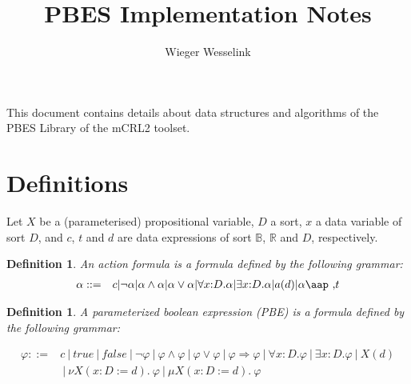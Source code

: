 \documentclass{article}
\title{PBES Implementation Notes}
\author{Wieger Wesselink}
\newtheorem{definition}[theorem]{Definition}
\begin{document}
\maketitle

This document contains details about data structures and algorithms of the
PBES Library of the mCRL2 toolset.

\section{Definitions}

Let $X$ be a (parameterised) propositional variable, $D$ a sort, $x$ a data
variable of sort $D$, and $c$, $t$ and $d$ are data expressions of sort $%
\mathbb{B}$, $\mathbb{R}$ and $D$, respectively.


\begin{definition}
An action formula is a formula defined by the following grammar:
\begin{equation*}
\begin{array}{lc}
\alpha ::= & c|\lnot \alpha |\alpha \wedge \alpha |\alpha \vee \alpha
|\forall x{:}D.\alpha |\exists x{:}D.\alpha |a(d)|\alpha \mbox{\aap ,}t%
\end{array}%
\end{equation*}
\end{definition}


\begin{definition}
A parameterized boolean expression (PBE) is a formula defined by the
following grammar:
\end{definition}

\begin{equation*}
\begin{array}{lc}
\varphi ::= & c~|~true~|~false~|~\lnot \varphi ~|~\varphi \wedge \varphi
~|~\varphi \vee \varphi ~|~\varphi \Rightarrow \varphi ~|~\forall x{:}%
D.\varphi ~|~\exists x{:}D.\varphi ~|~X(d) \\
& ~|~\nu X(x{:}D:=d).~\varphi ~|~\mu X(x{:}D:=d).~\varphi%
\end{array}%
\end{equation*}

\end{document}

